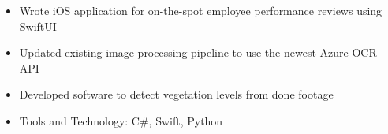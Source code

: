 \begin{itemize}
    \setlength\itemsep{0pt}
    \setlength{\parskip}{0pt}
    \item Wrote iOS application for on-the-spot employee performance reviews using SwiftUI
    \item Updated existing image processing pipeline to use the newest Azure OCR API
    \item Developed software to detect vegetation levels from done footage
    \item Tools and Technology: C\#, Swift, Python
\end{itemize}
